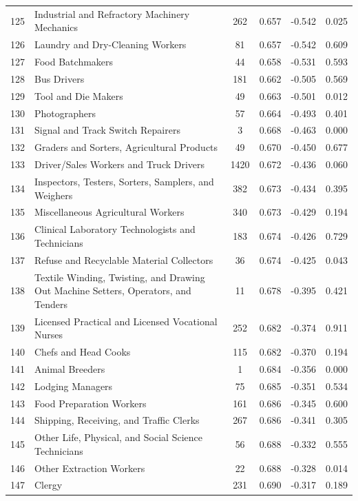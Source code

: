 {\begin{longtable}{llcccc}
 125 & Industrial and Refractory Machinery Mechanics & 262 & 0.657 & -0.542 & 0.025 \\
 126 & Laundry and Dry-Cleaning Workers & 81 & 0.657 & -0.542 & 0.609 \\
 127 & Food Batchmakers & 44 & 0.658 & -0.531 & 0.593 \\
 128 & Bus Drivers & 181 & 0.662 & -0.505 & 0.569 \\
 129 & Tool and Die Makers & 49 & 0.663 & -0.501 & 0.012 \\
 130 & Photographers & 57 & 0.664 & -0.493 & 0.401 \\
 131 & Signal and Track Switch Repairers & 3 & 0.668 & -0.463 & 0.000 \\
 132 & Graders and Sorters, Agricultural Products & 49 & 0.670 & -0.450 & 0.677 \\
 133 & Driver/Sales Workers and Truck Drivers & 1420 & 0.672 & -0.436 & 0.060 \\
 134 & Inspectors, Testers, Sorters, Samplers, and Weighers & 382 & 0.673 & -0.434 & 0.395 \\
 135 & Miscellaneous Agricultural Workers & 340 & 0.673 & -0.429 & 0.194 \\
 136 & Clinical Laboratory Technologists and Technicians & 183 & 0.674 & -0.426 & 0.729 \\
 137 & Refuse and Recyclable Material Collectors & 36 & 0.674 & -0.425 & 0.043 \\
 138 & Textile Winding, Twisting, and Drawing Out Machine Setters, Operators, and Tenders & 11 & 0.678 & -0.395 & 0.421 \\
 139 & Licensed Practical and Licensed Vocational Nurses & 252 & 0.682 & -0.374 & 0.911 \\
 140 & Chefs and Head Cooks & 115 & 0.682 & -0.370 & 0.194 \\
 141 & Animal Breeders & 1 & 0.684 & -0.356 & 0.000 \\
 142 & Lodging Managers & 75 & 0.685 & -0.351 & 0.534 \\
 143 & Food Preparation Workers & 161 & 0.686 & -0.345 & 0.600 \\
 144 & Shipping, Receiving, and Traffic Clerks & 267 & 0.686 & -0.341 & 0.305 \\
 145 & Other Life, Physical, and Social Science Technicians & 56 & 0.688 & -0.332 & 0.555 \\
 146 & Other Extraction Workers & 22 & 0.688 & -0.328 & 0.014 \\
 147 & Clergy & 231 & 0.690 & -0.317 & 0.189 \\

\end{longtable}}
